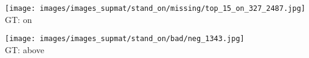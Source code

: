 \documentclass[10pt,twocolumn,letterpaper]{article}
\begin{document}
\begin{figure*}[t]
\begin{minipage}[t]{0.18\textwidth}
    	\texttt{[image: images/images\_supmat/stand\_on/missing/top\_15\_on\_327\_2487.jpg]}\\
    	\vspace{0.3ex}
       	GT: on
       	\vspace{0.2ex}
    \end{minipage}
    \hspace{0.005\textwidth}
    \begin{minipage}[t]{0.18\textwidth}
    	\centering
       	\texttt{[image: images/images\_supmat/stand\_on/bad/neg\_1343.jpg]}\\
       	\vspace{0.3ex}
       	GT: above
       	\vspace{0.2ex}
    \end{minipage}      


\end{figure*}
\end{document}

